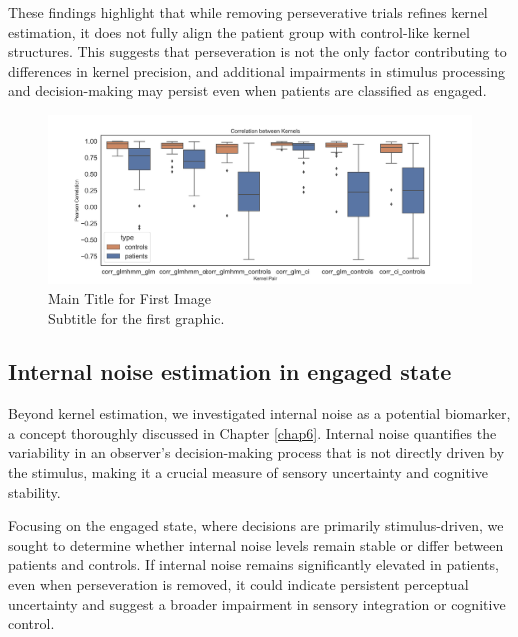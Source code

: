 These findings highlight that while removing perseverative trials refines kernel estimation, it does not fully align the patient group with control-like kernel structures. This suggests that perseveration is not the only factor contributing to differences in kernel precision, and additional impairments in stimulus processing and decision-making may persist even when patients are classified as engaged.

\begin{figure}[H]
    \centering
    \includegraphics[width=14cm]{MainLayout/Images/chapter7/corr.jpg}
    \caption{Main Title for First Image \\ \small Subtitle for the first graphic.}
    \label{fig:corr}
\end{figure}

\subsection{Internal noise estimation in engaged state}
Beyond kernel estimation, we investigated internal noise as a potential biomarker, a concept thoroughly discussed in Chapter \ref{chap6}. Internal noise quantifies the variability in an observer’s decision-making process that is not directly driven by the stimulus, making it a crucial measure of sensory uncertainty and cognitive stability.

Focusing on the engaged state, where decisions are primarily stimulus-driven, we sought to determine whether internal noise levels remain stable or differ between patients and controls. If internal noise remains significantly elevated in patients, even when perseveration is removed, it could indicate persistent perceptual uncertainty and suggest a broader impairment in sensory integration or cognitive control.

